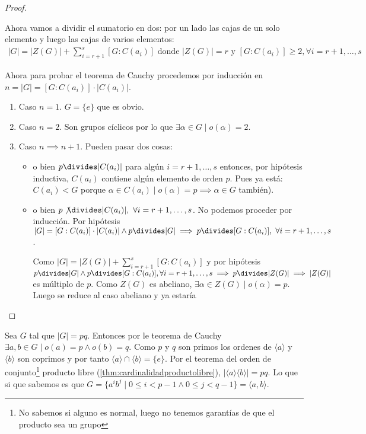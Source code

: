 \begin{proof}
\begin{itemize}
		Ahora vamos a dividir el sumatorio en dos: por un lado las cajas de un solo elemento y luego las cajas de varios elementos:
		\begin{align}
		\label{eq:thmcauchy}
		|G| = |Z(G)| + \sum_{i = r + 1}^{s} [G : C(a_i)] \text{ donde } |Z(G)| = r \text{ y } [G : C(a_i)] \geq 2, \forall i = r+1,\dots, s
		\end{align}
		
		Ahora para probar el teorema de Cauchy procedemos por inducción en $n = |G| = [G:C(a_i)]\cdot |C(a_i)|$.
		
		\begin{enumerate}
			\item Caso $n = 1$. $G = \{e\}$ que es obvio.
			\item Caso $n = 2$. Son grupos cíclicos por lo que $\exists \alpha \in G \mid o(\alpha) = 2$.
			\item Caso $n \implies n+1$. Pueden pasar dos cosas:
			\begin{itemize}
				\item o bien $p \divides |C(a_i)|$ para algún $i = r+1, \dots, s$ entonces, por hipótesis inductiva, $C(a_i)$ contiene algún elemento de orden $p$. Pues ya está: $C(a_i) < G$ porque $\alpha \in C(a_i) \mid o(\alpha) = p \implies \alpha \in G$ también). \qedsymbol
				
				\item o bien $p \not\divides |C(a_i)|,\ \forall i = r+1,\dots,s$. No podemos proceder por inducción. Por hipótesis $|G| = [G:C(a_i)]\cdot |C(a_i)| \land p \divides |G| \implies p \divides [G: C(a_i)],\ \forall i = r+1,\dots, s$.
				
				Como $|G| = |Z(G)| + \sum_{i = r + 1}^{s} [G : C(a_i)]$ y por hipótesis $p \divides |G| \land p \divides [G : C(a_i)], \forall i = r+1,\dots,s \implies p \divides |Z(G)| \implies |Z(G)|$ es múltiplo de $p$. Como $Z(G)$ es abeliano, $\exists \alpha \in Z(G) \mid o(\alpha) = p$. Luego se reduce al caso abeliano y ya estaría \qedhere
			\end{itemize}
		\end{enumerate}
	\end{itemize}
\end{proof}

\begin{ej}
	Sea $G$ tal que $|G| = pq$. Entonces por le teorema de Cauchy $\exists a,b \in G \mid o(a) = p \land o(b) = q$. Como $p$ y $q$ son primos los ordenes de $\langle a \rangle$ y $\langle b \rangle$ son coprimos y por tanto $\langle a \rangle \cap \langle b \rangle = \{e\}$. Por el teorema del orden de conjunto\footnote{No sabemos si alguno es normal, luego no tenemos garantías de que el producto sea un grupo} producto libre (\ref{thm:cardinalidadproductolibre}), $|\langle a \rangle \langle b \rangle| = pq$. Lo que si que sabemos es que $G = \{a^ib^j \mid 0 \leq i < p -1 \land 0 \leq j < q - 1\} = \langle a, b \rangle$.
\end{ej}

